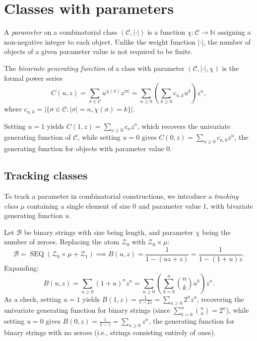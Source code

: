 \section*{Classes with parameters}

\begin{definition}
A \emph{parameter} on a combinatorial class \((\mathcal{C}, |\cdot|)\) is a function \(\chi \colon \mathcal{C} \to \mathbb{N}\) assigning a non-negative integer to each object.
Unlike the weight function \(|\cdot|\), the number of objects of a given parameter value is not required to be finite.
\end{definition}

\begin{definition}
The \emph{bivariate generating function} of a class with parameter \((\mathcal{C}, |\cdot|, \chi)\) is the formal power series
\[
    C(u, z) = \sum_{\sigma \in \mathcal{C}} u^{\chi(\sigma)} z^{|\sigma|} = \sum_{n \ge 0} \left( \sum_{k \ge 0} c_{n,k} u^k \right) z^n,
\]
where \(c_{n,k} = |\{\sigma \in \mathcal{C} : |\sigma| = n, \chi(\sigma) = k\}|\).
\end{definition}

Setting \(u=1\) yields \(C(1, z) = \sum_{n \ge 0} c_n z^n\), which recovers the univariate generating function of \(\mathcal{C}\), while setting \(u=0\) gives \(C(0, z) = \sum_{n \ge 0} c_{n,0} z^n\), the generating function for objects with parameter value \(0\).

\subsection*{Tracking classes}
To track a parameter in combinatorial constructions, we introduce a \emph{tracking class} \(\mu\) containing a single element of size \(0\) and parameter value \(1\), with bivariate generating function \(u\).

\begin{example}
    Let \(\mathcal{B}\) be binary strings with size being length, and parameter \(\chi\) being the number of zeroes.
    Replacing the atom \(\mathcal{Z}_0\) with \(\mathcal{Z}_0 \times \mu\):
    \[
        \mathcal{B} = \operatorname{SEQ}(\mathcal{Z}_0 \times \mu + \mathcal{Z}_1) \implies B(u, z) = \frac{1}{1 - (uz + z)} = \frac{1}{1 - (1+u)z}.
    \]
    Expanding:
    \[
        B(u, z) = \sum_{n \ge 0} (1+u)^n z^n = \sum_{n \ge 0} \left( \sum_{k=0}^n \binom{n}{k} u^k \right) z^n.
    \]
    As a check, setting \(u = 1\) yields \(B(1, z) = \frac{1}{1-2z} = \sum_{n \ge 0} 2^n z^n\), recovering the univariate generating function for binary strings (since \(\sum_{k=0}^n \binom{n}{k} = 2^n\)), while setting \(u = 0\) gives \(B(0, z) = \frac{1}{1-z} = \sum_{n \ge 0} z^n\), the generating function for binary strings with no zeroes (i.e., strings consisting entirely of ones).
\end{example}

